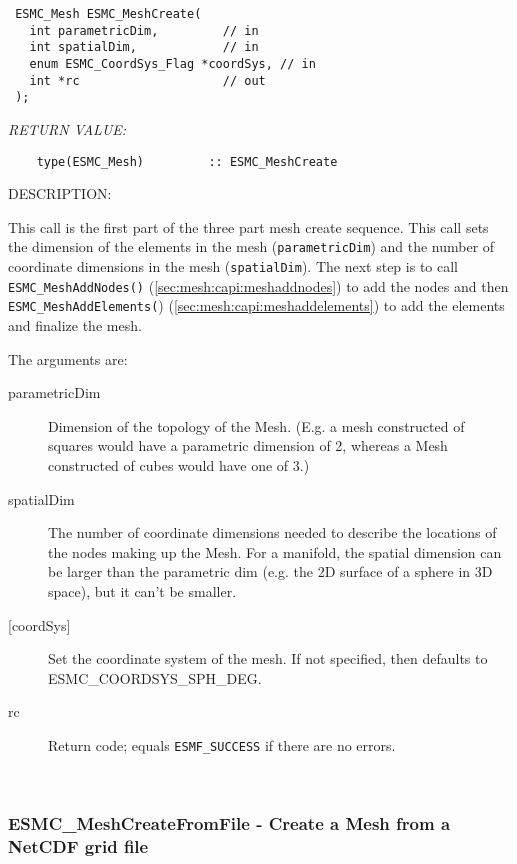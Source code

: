   
\begin{verbatim} ESMC_Mesh ESMC_MeshCreate(
   int parametricDim,         // in
   int spatialDim,            // in
   enum ESMC_CoordSys_Flag *coordSys, // in
   int *rc                    // out
 );\end{verbatim}{\em RETURN VALUE:}
\begin{verbatim}    type(ESMC_Mesh)         :: ESMC_MeshCreate\end{verbatim}
{\sf DESCRIPTION:\\ }


  
    This call is the first part of the three part mesh create sequence. This call sets the dimension of the elements
    in the mesh ({\tt parametricDim}) and the number of coordinate dimensions in the mesh ({\tt spatialDim}).
    The next step is to call {\tt ESMC\_MeshAddNodes()} (\ref{sec:mesh:capi:meshaddnodes}) to add the nodes and then
    {\tt ESMC\_MeshAddElements(})  (\ref{sec:mesh:capi:meshaddelements})
    to add the elements and finalize the mesh.
  
    The arguments are:
    \begin{description}
    \item[parametricDim]
      Dimension of the topology of the Mesh. (E.g. a mesh constructed of squares would have a parametric dimension
      of 2, whereas a Mesh constructed of cubes would have one of 3.)
    \item[spatialDim]
    The number of coordinate dimensions needed to describe the locations of the nodes making up the Mesh. For a
    manifold, the spatial dimension can be larger than the parametric dim (e.g. the 2D
    surface of a sphere in 3D space),
     but it can't be smaller.
    \item[{[coordSys]}]
    Set the coordinate system of the mesh. If not specified, then
    defaults to ESMC\_COORDSYS\_SPH\_DEG.
    \item[rc]
    Return code; equals {\tt ESMF\_SUCCESS} if there are no errors.
    \end{description}
   
 
\mbox{}\hrulefill\ 
 
\subsubsection [ESMC\_MeshCreateFromFile] {ESMC\_MeshCreateFromFile - Create a Mesh from a NetCDF grid file \label{sec:mesh:capi:meshcreatefromfile}}


